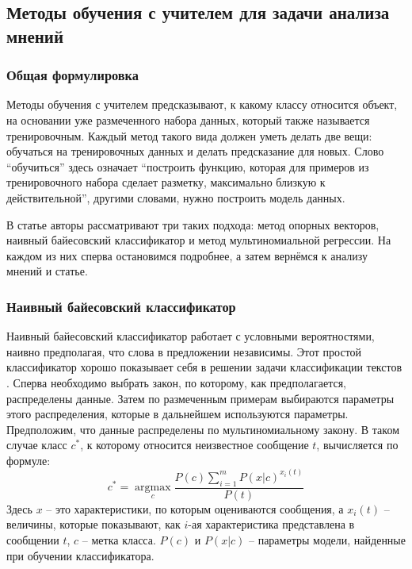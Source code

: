 \subsection{Методы обучения с учителем для задачи анализа мнений}

\subsubsection{Общая формулировка}
Методы обучения с учителем предсказывают, к какому классу относится объект, на основании уже
размеченного набора данных, который также называется тренировочным. Каждый метод такого вида должен
уметь делать две вещи: обучаться на тренировочных данных и делать предсказание для новых. Слово
``обучиться'' здесь означает ``построить функцию, которая для примеров из тренировочного набора
сделает разметку, максимально близкую к действительной'', другими словами, нужно построить модель
данных.

В статье \cite{pang2002thumbs} авторы рассматривают три таких подхода: метод опорных
векторов, наивный байесовский классификатор и метод мультиномиальной регрессии. На каждом из них
сперва остановимся подробнее, а затем вернёмся к анализу мнений и статье.

\subsubsection{Наивный байесовский классификатор}
Наивный байесовский классификатор \cite{citeulike:11350907} работает с условными вероятностями,
наивно предполагая, что слова в предложении независимы. Этот простой классификатор хорошо показывает
себя в решении задачи классификации текстов \cite{manning1999foundations}. Сперва необходимо выбрать закон,
по которому, как предполагается, распределены данные. Затем по размеченным примерам выбираются
параметры этого распределения, которые в дальнейшем используются параметры. Предположим, что данные
распределены по мультиномиальному закону. В таком случае класс $c^*$, к которому относится
неизвестное сообщение $t$, вычисляется по формуле:
$$c^* = \operatorname{arg max}\limits_c \frac{P(c) \sum_{i=1}^mP(x|c)^{x_i(t)}}{P(t)}$$
Здесь $x$ -- это характеристики, по которым оцениваются сообщения, а $x_i(t)$ -- величины, которые
показывают, как $i$-ая характеристика представлена в сообщении $t$, $c$ -- метка класса. $P(c)$ и $P(x|c)$ -- параметры
модели, найденные при обучении классификатора.

